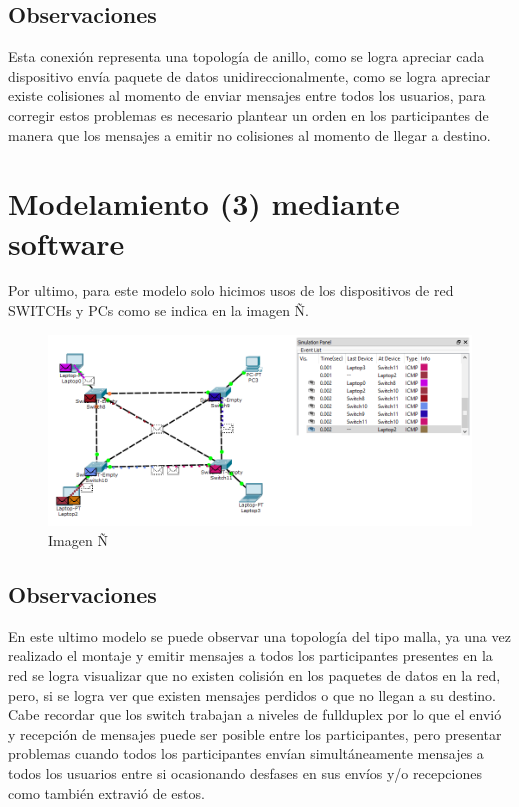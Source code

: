 \documentclass[spanish]{udpreport}
\begin{document}
\subsection{Observaciones}
Esta conexión representa una topología de anillo, como se logra apreciar cada dispositivo envía paquete de datos unidireccionalmente, como se logra apreciar existe colisiones al momento de enviar mensajes entre todos los usuarios, para corregir estos problemas es necesario plantear un orden en los participantes de manera que los mensajes a emitir no colisiones al momento de llegar a destino.
\section{Modelamiento (3) mediante software}
Por ultimo, para este modelo solo hicimos  usos  de los dispositivos de red SWITCHs y PCs como se indica en la imagen Ñ.
\begin{figure}[h]
    \centering
    \includegraphics[scale=0.3]{images/EJEMPLO3 LIS.png}
    \caption{Imagen Ñ}
    \label{fig:my_label}
\end{figure}
\newpage
\subsection{Observaciones}
En este ultimo modelo se puede observar una topología del tipo malla, ya una vez realizado el montaje y emitir mensajes a todos los participantes presentes en la red se logra visualizar que no existen colisión en los paquetes de datos en la red, pero, si se logra ver que existen mensajes perdidos o que no llegan a su destino.
\\[0.4cm]
Cabe recordar que los switch trabajan a niveles de fullduplex por lo que el envió y recepción de mensajes puede ser posible entre los participantes, pero  presentar problemas cuando todos los participantes envían simultáneamente mensajes a todos los usuarios entre si ocasionando desfases en sus envíos y/o recepciones como también extravió de estos.
\newpage
\end{document}
